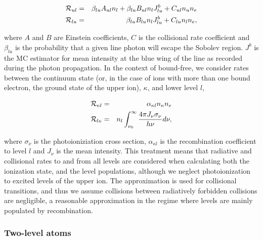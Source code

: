 \documentclass[preprint, a4paper, 11pt]{aastex}
\begin{document}
\begin{eqnarray}
{\cal R}_{ul} &= & \beta_{lu} A_{ul} n_l + \beta_{lu} B_{ul} n_l J_{lu}^b + C_{ul} n_u n_e\label{eq:nlte_rul}\\
{\cal R}_{lu} &= & \beta_{lu} B_{lu} n_l J_{lu}^b + C_{lu} n_l n_e,
\end{eqnarray}


where $A$ and $B$ are Einstein coefficients, $C$ is the collisional rate coefficient and
$\beta_{lu}$ is the probability that a given line photon will escape the Sobolev
region. $J^b$ is the MC estimator for mean intensity at the blue wing of the line as 
recorded during the photon propagation. In the context of 
bound-free, we consider rates between the continuum state (or, in the case of ions with more than one 
bound electron, the ground state of the upper ion), $\kappa$,
and lower level $l$,

\begin{eqnarray}
{\cal R}_{\kappa l} &= & \alpha_{\kappa l} n_{\kappa} n_e \\
{\cal R}_{l \kappa} &= & n_l \int_{\nu_0}^{\infty} \frac{ 4 \pi J_{\nu} \sigma_{\nu}}{h \nu} d\nu,
\end{eqnarray}

where $\sigma_{\nu}$ is the photoioniziation cross section, $\alpha_{\kappa l}$ is the recombination
coefficient to level $l$ and $J_{\nu}$ is the mean intensity.
This treatment means that radiative and collisional rates to and from all 
levels are considered when calculating both the ionization state, and the level populations, 
although we neglect photoionization to excited levels of the upper ion. 
The \cite{vanregemorter} approximation is used for collisional transitions,
and thus we assume collisions between radiatively forbidden collisions are
negligible, a reasonable approximation in the regime where levels are mainly populated
by recombination. 

\subsubsection{Two-level atoms}
\end{document}
